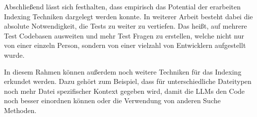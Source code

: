 \documentclass[../main.tex]{subfiles}
\begin{document}
Abschließend lässt sich festhalten, dass empirisch das Potential der erarbeiten Indexing Techniken dargelegt werden konnte.
In weiterer Arbeit besteht dabei die absolute Notwendigkeit, die Tests zu weiter zu vertiefen.
Das heißt, auf mehrere Test Codebasen ausweiten und mehr Test Fragen zu erstellen, welche nicht nur von einer einzeln Person, sondern von einer vielzahl von Entwicklern aufgestellt wurde.

In diesem Rahmen können außerdem noch weitere Techniken für das Indexing erkundet werden.
Dazu gehört zum Beispiel, dass für unterschiedliche Dateitypen noch mehr Datei spezifischer Kontext gegeben wird, damit die \glspl{LLM} den Code noch besser einordnen können oder die Verwendung von anderen Suche Methoden.
\end{document}

